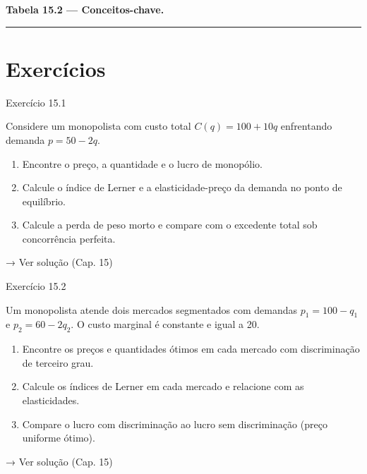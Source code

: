 \documentclass[11pt,twoside,openright]{book}
\begin{document}
\textbf{Tabela 15.2 --- Conceitos-chave.}

\begin{center}\rule{0.5\linewidth}{0.5pt}\end{center}

\section{Exercícios}\label{exercuxedcios-1}

\begin{exresolvidobox}{Exercício 15.1}

Considere um monopolista com custo total \(C(q) = 100 + 10q\)
enfrentando demanda \(p = 50 - 2q\).

\begin{enumerate}
\def\labelenumi{\alph{enumi})}
\item
  Encontre o preço, a quantidade e o lucro de monopólio.
\item
  Calcule o índice de Lerner e a elasticidade-preço da demanda no ponto
  de equilíbrio.
\item
  Calcule a perda de peso morto e compare com o excedente total sob
  concorrência perfeita.
\end{enumerate}

→ Ver solução (Cap. 15)

\end{exresolvidobox}

\begin{exresolvidobox}{Exercício 15.2}

Um monopolista atende dois mercados segmentados com demandas
\(p_1 = 100 - q_1\) e \(p_2 = 60 - 2q_2\). O custo marginal é constante
e igual a 20.

\begin{enumerate}
\def\labelenumi{\alph{enumi})}
\item
  Encontre os preços e quantidades ótimos em cada mercado com
  discriminação de terceiro grau.
\item
  Calcule os índices de Lerner em cada mercado e relacione com as
  elasticidades.
\item
  Compare o lucro com discriminação ao lucro sem discriminação (preço
  uniforme ótimo).
\end{enumerate}

→ Ver solução (Cap. 15)

\end{exresolvidobox}
\end{document}

